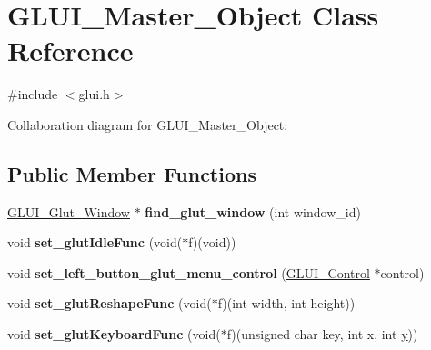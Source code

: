 \hypertarget{class_g_l_u_i___master___object}{\section{G\+L\+U\+I\+\_\+\+Master\+\_\+\+Object Class Reference}
\label{class_g_l_u_i___master___object}
}


{\ttfamily \#include $<$glui.\+h$>$}



Collaboration diagram for G\+L\+U\+I\+\_\+\+Master\+\_\+\+Object\+:
\subsection*{Public Member Functions}
\begin{DoxyCompactItemize}
\item 
\hypertarget{class_g_l_u_i___master___object_a4f83ffb0d77f643fce91cfc962d5984c}{\hyperlink{class_g_l_u_i___glut___window}{G\+L\+U\+I\+\_\+\+Glut\+\_\+\+Window} $\ast$ {\bfseries find\+\_\+glut\+\_\+window} (int window\+\_\+id)}\label{class_g_l_u_i___master___object_a4f83ffb0d77f643fce91cfc962d5984c}

\item 
\hypertarget{class_g_l_u_i___master___object_a5d1b3a7cc294314dda9864cd7bd64a62}{void {\bfseries set\+\_\+glut\+Idle\+Func} (void($\ast$f)(void))}\label{class_g_l_u_i___master___object_a5d1b3a7cc294314dda9864cd7bd64a62}

\item 
\hypertarget{class_g_l_u_i___master___object_afb8aea4fc250cddb252570508acbd603}{void {\bfseries set\+\_\+left\+\_\+button\+\_\+glut\+\_\+menu\+\_\+control} (\hyperlink{class_g_l_u_i___control}{G\+L\+U\+I\+\_\+\+Control} $\ast$control)}\label{class_g_l_u_i___master___object_afb8aea4fc250cddb252570508acbd603}

\item 
\hypertarget{class_g_l_u_i___master___object_aed8155ef565e847af72ba26478daa388}{void {\bfseries set\+\_\+glut\+Reshape\+Func} (void($\ast$f)(int width, int height))}\label{class_g_l_u_i___master___object_aed8155ef565e847af72ba26478daa388}

\item 
\hypertarget{class_g_l_u_i___master___object_aec70f38a81424a09c42f5a3e4e6edc43}{void {\bfseries set\+\_\+glut\+Keyboard\+Func} (void($\ast$f)(unsigned char key, int x, int \hyperlink{_ice_utils_8h_aa7ffaed69623192258fb8679569ff9ba}{y}))}\label{class_g_l_u_i___master___object_aec70f38a81424a09c42f5a3e4e6edc43}


\end{DoxyCompactItemize}
